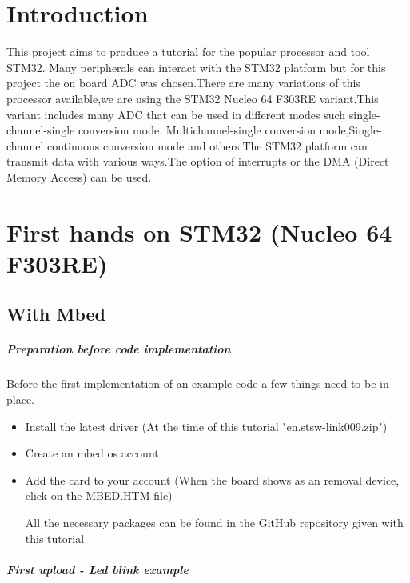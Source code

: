 \documentclass[a4paper, 11pt, openany, oneside]{book}
\begin{document}
\frontmatter
\umonsCoverPage
\tableofcontents
\newpage

\mainmatter
{}
\chapter*{Introduction}
This project aims to produce a tutorial for the popular  processor and tool STM32. Many peripherals can interact with the STM32 platform but for this project the on board ADC was chosen.There are many variations of this  processor  available,we are using the STM32 Nucleo 64 F303RE variant.This variant includes many ADC that can be used in different modes such single-channel-single conversion mode, Multichannel-single conversion mode,Single-channel continuous conversion mode and others.The STM32 platform can transmit data with various ways.The option of interrupts or the DMA (Direct Memory Access) can be used.


\chapter{First hands on STM32 (Nucleo 64 F303RE)}
\section{With Mbed}
\paragraph{Preparation before code implementation}
Before the first implementation of an example code a few things need to be in place.


\begin{itemize}
  \item Install the latest driver (At the time of this tutorial "en.stsw-link009.zip")
  \item Create an mbed os account
  \item Add the card to your account (When the board shows as an removal device, click on the MBED.HTM file)
  
All the necessary packages can be found in the GitHub repository given with this tutorial
\end{itemize}

\paragraph{First upload - Led blink example }
\end{document}
